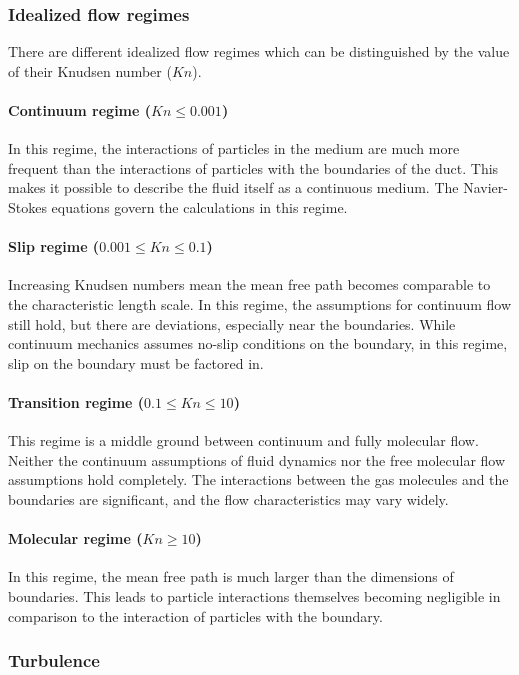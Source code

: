 \subsubsection{Idealized flow regimes}
There are different idealized flow regimes which can be distinguished by the value of their Knudsen number (\(Kn\)).

\paragraph{Continuum regime (\(Kn \leq 0.001\))}
In this regime, the interactions of particles in the medium are much more frequent than the interactions of particles with the boundaries of the duct. This makes it possible to describe the fluid itself as a continuous medium. The Navier-Stokes equations govern the calculations in this regime.

\paragraph{Slip regime (\(0.001 \leq Kn \leq 0.1\))}
Increasing Knudsen numbers mean the mean free path becomes comparable to the characteristic length scale. In this regime, the assumptions for continuum flow still hold, but there are deviations, especially near the boundaries. While continuum mechanics assumes no-slip conditions on the boundary, in this regime, slip on the boundary must be factored in.

\paragraph{Transition regime (\(0.1 \leq Kn \leq 10\))}
This regime is a middle ground between continuum and fully molecular flow. Neither the continuum assumptions of fluid dynamics nor the free molecular flow assumptions hold completely. The interactions between the gas molecules and the boundaries are significant, and the flow characteristics may vary widely.

\paragraph{Molecular regime (\(Kn \geq 10\))}
In this regime, the mean free path is much larger than the dimensions of boundaries. This leads to particle interactions themselves becoming negligible in comparison to the interaction of particles with the boundary.

\newpage
\subsubsection{Turbulence}

